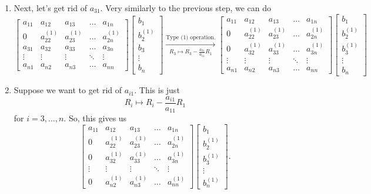 \documentclass[letterpaper]{article}
\newcommand{\0}{\mathbf{0}}
\begin{document}
\begin{enumerate}
    \item Next, let's get rid of $a_{31}$. Very similarly to the previous step, we can do
    \[\begin{bmatrix}
        a_{11} & a_{12} & a_{13} & \hdots & a_{1n} \\ 
        0      & a_{22}^{(1)} & a_{23}^{(1)} & \hdots & a_{2n}^{(1)} \\ 
        a_{31} & a_{32} & a_{33} & \hdots & a_{3n} \\ 
        \vdots & \vdots & \vdots & \ddots & \vdots \\ 
        a_{n1} & a_{n2} & a_{n3} & \hdots & a_{nn}
    \end{bmatrix} \begin{bmatrix}
        b_1 \\ b_2^{(1)} \\ b_3 \\ \vdots \\ b_n
    \end{bmatrix} \xrightarrow[R_3 \mapsto R_3 - \frac{a_{31}}{a_{11}}R_1]{\text{Type (1) operation.}} \begin{bmatrix}
        a_{11} & a_{12} & a_{13} & \hdots & a_{1n} \\ 
        0      & a_{22}^{(1)} & a_{23}^{(1)} & \hdots & a_{2n}^{(1)} \\ 
        0      & a_{32}^{(1)} & a_{33}^{(1)} & \hdots & a_{3n}^{(1)} \\ 
        \vdots & \vdots & \vdots & \ddots & \vdots \\ 
        a_{n1} & a_{n2} & a_{n3} & \hdots & a_{nn}
    \end{bmatrix} \begin{bmatrix}
        b_1 \\ b_2^{(1)} \\ b_3^{(1)} \\ \vdots \\ b_n
    \end{bmatrix}\]

    \item Suppose we want to get rid of $a_{i1}$. This is just 
    \[R_i \mapsto R_i - \frac{a_{i1}}{a_{11}}R_1\]
    for $i = 3, \hdots, n$. So, this gives us 
    \[\begin{bmatrix}
        a_{11} & a_{12} & a_{13} & \hdots & a_{1n} \\ 
        0      & a_{22}^{(1)} & a_{23}^{(1)} & \hdots & a_{2n}^{(1)} \\ 
        0      & a_{32}^{(1)} & a_{33}^{(1)} & \hdots & a_{3n}^{(1)} \\ 
        \vdots & \vdots & \vdots & \ddots & \vdots \\ 
        0      & a_{n2}^{(1)} & a_{n3}^{(1)} & \hdots & a_{nn}^{(1)}
    \end{bmatrix} \begin{bmatrix}
        b_1 \\ b_2^{(1)} \\ b_3^{(1)} \\ \vdots \\ b_n^{(1)}
    \end{bmatrix}.\]
\end{enumerate}
\end{document}
